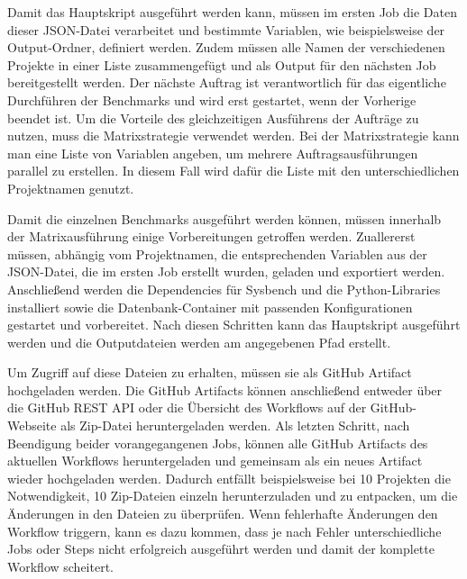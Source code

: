 Damit das Hauptskript ausgeführt werden kann, müssen im ersten Job die Daten dieser JSON-Datei verarbeitet und bestimmte Variablen, wie beispielsweise der Output-Ordner, definiert werden.
Zudem müssen alle Namen der verschiedenen Projekte in einer Liste zusammengefügt und als Output für den nächsten Job bereitgestellt werden.
Der nächste Auftrag ist verantwortlich für das eigentliche Durchführen der Benchmarks und wird erst gestartet, wenn der Vorherige beendet ist.
Um die Vorteile des gleichzeitigen Ausführens der Aufträge zu nutzen, muss die Matrixstrategie verwendet werden.
Bei der Matrixstrategie kann man eine Liste von Variablen angeben, um mehrere Auftragsausführungen parallel zu erstellen.
In diesem Fall wird dafür die Liste mit den unterschiedlichen Projektnamen genutzt.

Damit die einzelnen Benchmarks ausgeführt werden können, müssen innerhalb der Matrixausführung einige Vorbereitungen getroffen werden.
Zuallererst müssen, abhängig vom Projektnamen, die entsprechenden Variablen aus der JSON-Datei, die im ersten Job erstellt wurden, geladen und exportiert werden.
Anschließend werden die Dependencies für Sysbench und die Python-Libraries installiert sowie die Datenbank-Container mit passenden Konfigurationen gestartet und vorbereitet.
Nach diesen Schritten kann das Hauptskript ausgeführt werden und die Outputdateien werden am angegebenen Pfad erstellt.

Um Zugriff auf diese Dateien zu erhalten, müssen sie als GitHub Artifact hochgeladen werden.
Die GitHub Artifacts können anschließend entweder über die GitHub REST API oder die Übersicht des Workflows auf der GitHub-Webseite als Zip-Datei heruntergeladen werden.
Als letzten Schritt, nach Beendigung beider vorangegangenen Jobs, können alle GitHub Artifacts des aktuellen Workflows heruntergeladen und gemeinsam als ein neues Artifact wieder hochgeladen werden.
Dadurch entfällt beispielsweise bei 10 Projekten die Notwendigkeit, 10 Zip-Dateien einzeln herunterzuladen und zu entpacken, um die Änderungen in den Dateien zu überprüfen.
Wenn fehlerhafte Änderungen den Workflow triggern, kann es dazu kommen, dass je nach Fehler unterschiedliche Jobs oder Steps nicht erfolgreich ausgeführt werden und damit der komplette Workflow scheitert.

